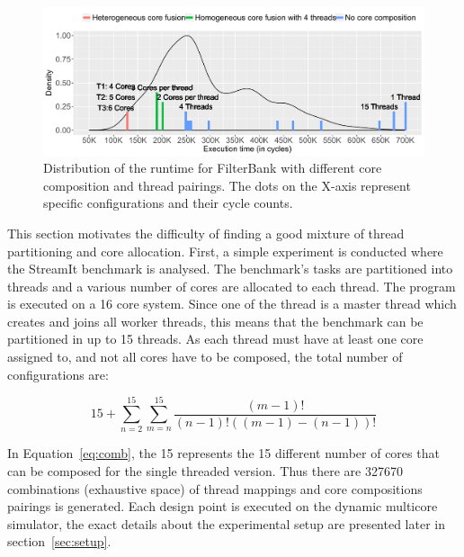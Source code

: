 
\begin{figure}[t]
    \centering
    \includegraphics[width=1\textwidth]{streamit-paper/graphics/filterbank_motivation_2.pdf}
    \caption{Distribution of the runtime for FilterBank with different core composition and thread pairings. The dots on the X-axis represent specific configurations and their cycle counts.}
     \label{fig:threadcoremotiv}
\end{figure}

This section motivates the difficulty of finding a good mixture of thread partitioning and core allocation.
First, a simple experiment is conducted where the  StreamIt benchmark is analysed.
The benchmark's tasks are partitioned into threads and a various number of cores are allocated to each thread.
The program is executed on a 16 core system.
Since one of the thread is a master thread which creates and joins all worker threads, this means that the benchmark can be partitioned in up to 15 threads.
As each thread must have at least one core assigned to, and not all cores have to be composed, the total number of configurations are:

\begin{equation}
15 + \sum_{n=2}^{15} \sum_{m=n}^{15} \frac{(m-1)!}{(n-1)!((m-1)-(n-1))!}
\label{eq:comb}
\end{equation}

In Equation~\ref{eq:comb}, the 15 represents the 15 different number of cores that can be composed for the single threaded version.
Thus there are 327670 combinations (exhaustive space) of thread mappings and core compositions pairings is generated.
Each design point is executed on the dynamic multicore simulator, the exact details about the experimental setup are presented later in section~\ref{sec:setup}.

